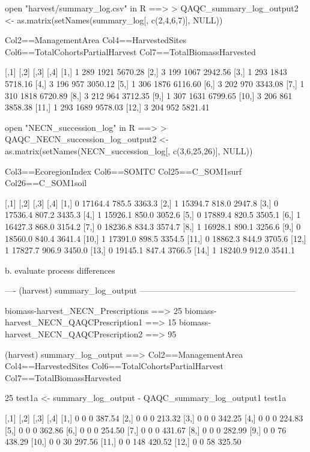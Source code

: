 open "harvest/summary_log.csv" in R ==>
> QAQC_summary_log_output2 <- as.matrix(setNames(summary_log[, c(2,4,6,7)], NULL))

Col2==ManagementArea
Col4==HarvestedSites
Col6==TotalCohortsPartialHarvest
Col7==TotalBiomassHarvested

      [,1] [,2] [,3]    [,4]
 [1,]    1  289 1921 5670.28
 [2,]    3  199 1067 2942.56
 [3,]    1  293 1843 5718.16
 [4,]    3  196  957 3050.12
 [5,]    1  306 1876 6116.60
 [6,]    3  202  970 3343.08
 [7,]    1  310 1818 6720.89
 [8,]    3  212  964 3712.35
 [9,]    1  307 1631 6799.65
[10,]    3  206  861 3858.38
[11,]    1  293 1689 9578.03
[12,]    3  204  952 5821.41



open "NECN_succession_log" in R ==>
> QAQC_NECN_succession_log_output2 <- as.matrix(setNames(NECN_succession_log[, c(3,6,25,26)], NULL))

Col3==EcoregionIndex
Col6==SOMTC
Col25==C_SOM1surf
Col26==C_SOM1soil


      [,1]    [,2]  [,3]   [,4]
 [1,]    0 17164.4 785.5 3363.3
 [2,]    1 15394.7 818.0 2947.8
 [3,]    0 17536.4 807.2 3435.3
 [4,]    1 15926.1 850.0 3052.6
 [5,]    0 17889.4 820.5 3505.1
 [6,]    1 16427.3 868.0 3154.2
 [7,]    0 18236.8 834.3 3574.7
 [8,]    1 16928.1 890.1 3256.6
 [9,]    0 18560.0 840.4 3641.4
[10,]    1 17391.0 898.5 3354.5
[11,]    0 18862.3 844.9 3705.6
[12,]    1 17827.7 906.9 3450.0
[13,]    0 19145.1 847.4 3766.5
[14,]    1 18240.9 912.0 3541.1









	b. evaluate process differences

---- (harvest) summary_log_output --------------------------------------------------------

biomass-harvest_NECN_Prescriptions	==> 25%
biomass-harvest_NECN_QAQCPrescription1	==> 15%
biomass-harvest_NECN_QAQCPrescription2	==> 95%

(harvest) summary_log_output ==>
Col2==ManagementArea
Col4==HarvestedSites
Col6==TotalCohortsPartialHarvest
Col7==TotalBiomassHarvested

25%
test1a <- summary_log_output - QAQC_summary_log_output1
test1a

      [,1] [,2] [,3]   [,4]
 [1,]    0    0    0 387.54
 [2,]    0    0    0 213.32
 [3,]    0    0    0 342.25
 [4,]    0    0    0 224.83
 [5,]    0    0    0 362.86
 [6,]    0    0    0 254.50
 [7,]    0    0    0 431.67
 [8,]    0    0    0 282.99
 [9,]    0    0   76 438.29
[10,]    0    0   30 297.56
[11,]    0    0  148 420.52
[12,]    0    0   58 325.50


